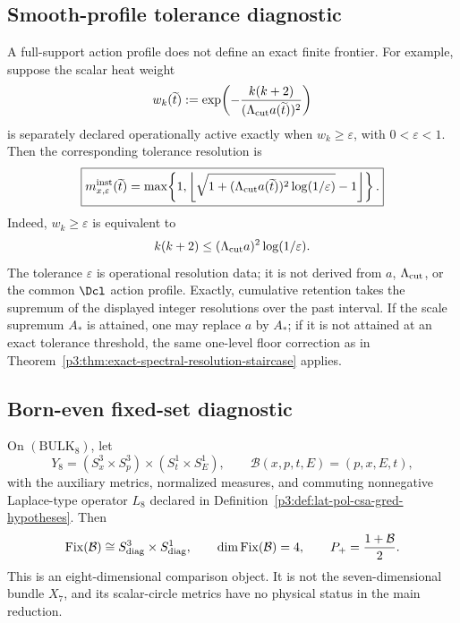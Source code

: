 \documentclass[11pt,a4paper]{article}
\begin{document}
\subsection{Smooth-profile tolerance diagnostic}
\label{p3f:app:smooth-profile-resolution}
A full-support action profile does not define an exact finite frontier.  For
example, suppose the scalar heat weight
\[
 w_k(\widetilde t)
 :=\exp\!\left(
 -\frac{k(k+2)}
 {(\Lambda_{\rm cut}a(\widetilde t))^2}\right)
\]
is separately declared operationally active exactly when
\(w_k\ge\varepsilon\), with \(0<\varepsilon<1\).  Then the corresponding
tolerance resolution is
\[
 \boxed{
 m_{x,\varepsilon}^{\rm inst}(\widetilde t)
 =\max\!\left\{1,
 \left\lfloor
 \sqrt{1+(\Lambda_{\rm cut}a(\widetilde t))^2
 \log(1/\varepsilon)}-1
 \right\rfloor\right\}.}
\]
Indeed, \(w_k\ge\varepsilon\) is equivalent to
\[
 k(k+2)\le
 (\Lambda_{\rm cut}a)^2\log(1/\varepsilon).
\]
The tolerance \(\varepsilon\) is operational resolution data; it is not
derived from \(a\), \(\Lambda_{\rm cut}\), or the common \(\Dcl\) action
profile.  Exactly, cumulative retention takes the supremum of the displayed
integer resolutions over the past interval.  If the scale supremum \(A_*\) is
attained, one may replace \(a\) by \(A_*\); if it is not attained at an exact
tolerance threshold, the same one-level floor correction as in
Theorem~\ref{p3:thm:exact-spectral-resolution-staircase} applies.

\subsection{Born-even fixed-set diagnostic}
\label{p3f:app:born-even-fixed-set}

\begin{definition}
\label{p3f:def:born-eight-dimensional-diagnostic}
On \((\mathrm{BULK}_8)\), let
\[
 Y_8=(S_x^3\times S_p^3)\times(S_t^1\times S_E^1),
 \qquad
 \mathcal B(x,p,t,E)=(p,x,E,t),
\]
with the auxiliary metrics, normalized measures, and commuting nonnegative
Laplace-type operator \(L_8\) declared in
Definition~\ref{p3:def:lat-pol-csa-gred-hypotheses}.  Then
\[
 \operatorname{Fix}(\mathcal B)
 \cong S^3_{\rm diag}\times S^1_{\rm diag},
 \qquad \dim\operatorname{Fix}(\mathcal B)=4,
 \qquad P_+=\frac{1+\mathcal B}{2}.
\]
This is an eight-dimensional comparison object.  It is not the
seven-dimensional bundle \(X_7\), and its scalar-circle metrics have no
physical status in the main reduction.
\end{definition}
\end{document}
